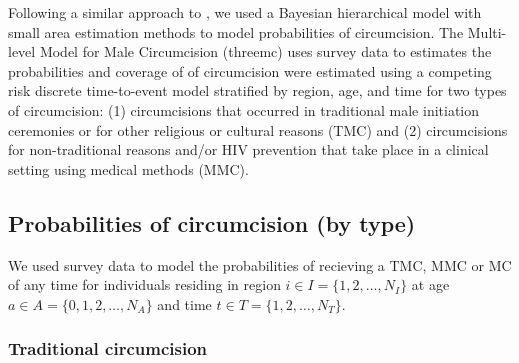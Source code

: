 \documentclass{article}
\begin{document}
\begin{appendix}
\noindent Following a similar approach to \cite{thomas2021multilevel}, we used a Bayesian hierarchical model with small area estimation methods to model probabilities of
circumcision. The Multi-level Model for Male Circumcision (threemc) uses survey data to estimates the probabilities and coverage of of circumcision were estimated using a competing risk discrete time-to-event model stratified by region, age, and time for two types of circumcision: (1) circumcisions that occurred in traditional male initiation ceremonies or for other religious or cultural reasons (TMC) and (2) circumcisions for non-traditional reasons and/or HIV prevention that take place in a clinical setting using medical methods (MMC). 


\subsection{Probabilities of circumcision (by type)}
\label{sec::tradcirc}


We used survey data to model the probabilities of recieving a TMC, MMC or MC of any time for individuals residing in region $i \in I = \{1, 2, \ldots, N_I\}$ at age $a \in A = \{0, 1, 2, \ldots, N_A\}$ and time $t \in T = \{1, 2, \ldots, N_T\}$. 


\subsubsection*{Traditional circumcision}



\end{appendix}
\end{document}
